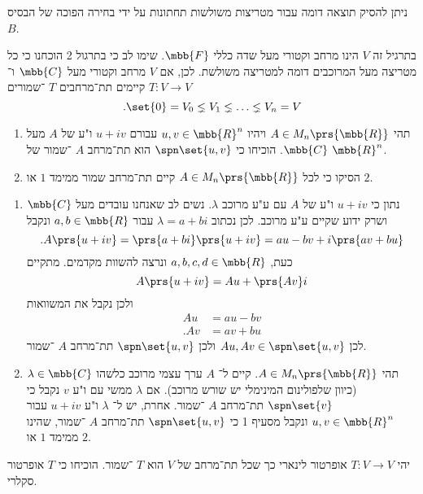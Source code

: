 \documentclass[article, 10pt,oneside]{article}
\begin{document}
\begin{remark}
ניתן להסיק תוצאה דומה עבור מטריצות משולשות תחתונות על ידי בחירה הפוכה של הבסיס
$B$.
\end{remark}

\begin{remark}
בתרגיל זה
$V$
הינו מרחב וקטורי מעל שדה כללי
$\mbb{F}$.
שימו לב כי בתרגול 2 הוכחנו כי כל מטריצה מעל המרוכבים דומה למטריצה משולשת. לכן, אם
$V$
מרחב וקטורי מעל
$\mbb{C}$
ו־%
$T \colon V \to V$
קיימים תת־מרחבים
$T$%
־שמורים
\[\text{.} \set{0} = V_0 \lneq V_1 \lneq \ldots \lneq V_n = V\]
\end{remark}

\begin{exercise}
\begin{enumerate}
\item
תהי
$A \in M_n\prs{\mbb{R}}$
ויהיו
$u,v \in \mbb{R}^n$
עבורם
$u + iv$
ו"ע של
$A$
מעל
$\mbb{C}$.
הוכיחו כי
$\spn\set{u,v}$
הוא תת־מרחב
$A$%
־שמור של
$\mbb{R}^n$.
\item הסיקו כי לכל
$A \in M_n\prs{\mbb{R}}$
קיים תת־מרחב שמור ממימד
$1$
או
$2$.
\end{enumerate}
\end{exercise}

\begin{solution}
\begin{enumerate}
\item
נתון כי
$u+iv$
ו"ע של
$A$
עם ע"ע מרוכב
$\lambda$.
נשים לב שאנחנו עובדים מעל
$\mbb{C}$
ושרק ידוע שקיים ע"ע מרוכב.
לכן נכתוב
$\lambda = a+bi$
עבור
$a,b \in \mbb{R}$
ונקבל
\[\text{.} A\prs{u+iv} = \prs{a+bi}\prs{u+iv} = au -bv + i\prs{av + bu}\]
כעת,
$a,b,c,d \in \mbb{R}$
ונרצה להשוות מקדמים.
מתקיים
\[A\prs{u+iv} = Au + \prs{Av}i\]
ולכן נקבל את המשוואות
\begin{align*}
Au &= au - bv \\
\text{.} Av &= av + bu 
\end{align*}
לכן
$Au, Av \in \spn\set{u,v}$
ולכן
$\spn\set{u,v}$
תת־מרחב
$A$%
־שמור.
\item
תהי
$A \in M_n\prs{\mbb{R}}$.
קיים ל־%
$A$
ערך עצמי מרוכב כלשהו
$\lambda \in \mbb{C}$
(כיוון שלפולינום המינימלי יש שורש מרוכב).
אם
$\lambda$
ממשי עם ו"ע
$v$
נקבל כי
$\spn\set{v}$
תת־מרחב
$A$%
־שמור.
אחרת, יש ל־%
$\lambda$
ו"ע
$u+iv$
עבור
$u,v \in \mbb{R}^n$
ונקבל מסעיף 1 כי
$\spn\set{u,v}$
תת־מרחב
$A$%
־שמור, שהינו ממימד
$1$
או
$2$.
\end{enumerate}
\end{solution}

\begin{exercise}
יהי
$T \colon V \to V$
אופרטור לינארי כך שכל תת־מרחב של
$V$
הוא
$T$%
־שמור.
הוכיחו כי
$T$
אופרטור סקלרי.
\end{exercise}
\end{document}
